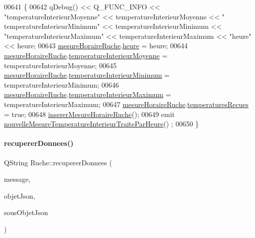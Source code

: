 \begin{DoxyCode}
00641 \{
00642     qDebug() << Q\_FUNC\_INFO << \textcolor{stringliteral}{"temperatureInterieurMoyenne"} << temperatureInterieurMoyenne << \textcolor{stringliteral}{"
      temperatureInterieurMinimum"} << temperatureInterieurMinimum << \textcolor{stringliteral}{"temperatureInterieurMaximum"} << 
      temperatureInterieurMaximum << \textcolor{stringliteral}{"heure"} << heure;
00643     \hyperlink{class_ruche_a9a68d3b7eb272e139f1532fdcbca2da3}{mesureHoraireRuche}.\hyperlink{struct_mesure_horaire_ruche_ab679cc7168deb6c3d2458c99b94e0611}{heure} = heure;
00644     \hyperlink{class_ruche_a9a68d3b7eb272e139f1532fdcbca2da3}{mesureHoraireRuche}.\hyperlink{struct_mesure_horaire_ruche_ac240bf701116e1a09f2bf33911bf57ef}{temperatureInterieurMoyenne} = 
      temperatureInterieurMoyenne;
00645     \hyperlink{class_ruche_a9a68d3b7eb272e139f1532fdcbca2da3}{mesureHoraireRuche}.\hyperlink{struct_mesure_horaire_ruche_a51c45378a78c733704df79b38d61afcc}{temperatureInterieurMinimum} = 
      temperatureInterieurMinimum;
00646     \hyperlink{class_ruche_a9a68d3b7eb272e139f1532fdcbca2da3}{mesureHoraireRuche}.\hyperlink{struct_mesure_horaire_ruche_a746c391a70735bfff63bf7271ab28ab8}{temperatureInterieurMaximum} = 
      temperatureInterieurMaximum;
00647     \hyperlink{class_ruche_a9a68d3b7eb272e139f1532fdcbca2da3}{mesureHoraireRuche}.\hyperlink{struct_mesure_horaire_ruche_ade9984cb0f2c62b3ba1369f77249bb4a}{temperaturesRecues} = \textcolor{keyword}{true};
00648     \hyperlink{class_ruche_a3a093c088d9c97f347394c8a681f7302}{insererMesureHoraireRuche}();
00649     emit \hyperlink{class_ruche_a5fdf12cb02acc7283f183a7aad906edc}{nouvelleMesureTemperatureInterieurTraiteParHeure}()
      ;
00650 \}
\end{DoxyCode}
\mbox{\label{class_ruche_a68e487fc714c68b7d4f761cad9122b39}} 
\paragraph{\texorpdfstring{recuperer\+Donnees()}{recupererDonnees()}}
{\footnotesize\ttfamily Q\+String Ruche\+::recuperer\+Donnees (\begin{DoxyParamCaption}\item[{Q\+Byte\+Array}]{message,  }\item[{Q\+String}]{objet\+Json,  }\item[{Q\+String}]{sous\+Objet\+Json }\end{DoxyParamCaption})\hspace{0.3cm}{\ttfamily [private]}}

